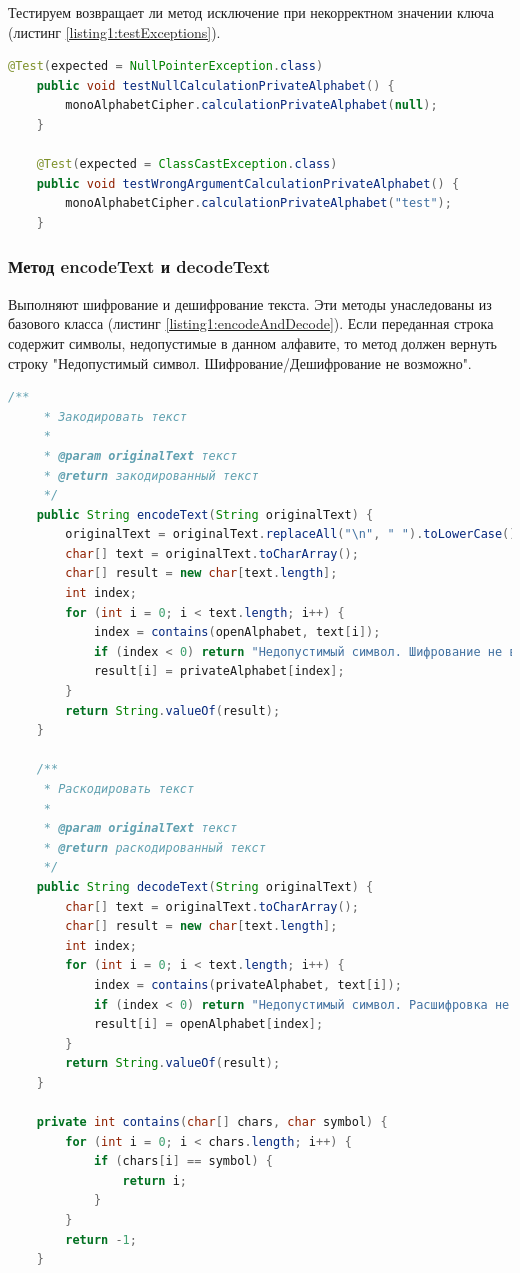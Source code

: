 \documentclass[a4paper,12pt]{article}
\begin{document}
Тестируем возвращает ли метод исключение при некорректном значении ключа (листинг \ref{listing1:testExceptions}).
\begin{lstlisting}[language=java, caption=методы проверки исключений, label = listing1:testExceptions]
	@Test(expected = NullPointerException.class)
    public void testNullCalculationPrivateAlphabet() {
        monoAlphabetCipher.calculationPrivateAlphabet(null);
    }

    @Test(expected = ClassCastException.class)
    public void testWrongArgumentCalculationPrivateAlphabet() {
        monoAlphabetCipher.calculationPrivateAlphabet("test");
    }
\end{lstlisting}
\subsubsection{Метод encodeText и decodeText}
Выполняют шифрование и дешифрование текста. Эти методы унаследованы из базового класса (листинг \ref{listing1:encodeAndDecode}). Если переданная строка содержит символы, недопустимые в данном алфавите, то метод должен вернуть строку "Недопустимый символ. Шифрование/Дешифрование не возможно".
\begin{lstlisting}[language=java, caption=методы encode и decode, label = listing1:encodeAndDecode]
     /**
     * Закодировать текст
     *
     * @param originalText текст
     * @return закодированный текст
     */
    public String encodeText(String originalText) {
        originalText = originalText.replaceAll("\n", " ").toLowerCase();
        char[] text = originalText.toCharArray();
        char[] result = new char[text.length];
        int index;
        for (int i = 0; i < text.length; i++) {
            index = contains(openAlphabet, text[i]);
            if (index < 0) return "Недопустимый символ. Шифрование не возможно";
            result[i] = privateAlphabet[index];
        }
        return String.valueOf(result);
    }

    /**
     * Раскодировать текст
     *
     * @param originalText текст
     * @return раскодированный текст
     */
    public String decodeText(String originalText) {
        char[] text = originalText.toCharArray();
        char[] result = new char[text.length];
        int index;
        for (int i = 0; i < text.length; i++) {
            index = contains(privateAlphabet, text[i]);
            if (index < 0) return "Недопустимый символ. Расшифровка не возможно";
            result[i] = openAlphabet[index];
        }
        return String.valueOf(result);
    }

    private int contains(char[] chars, char symbol) {
        for (int i = 0; i < chars.length; i++) {
            if (chars[i] == symbol) {
                return i;
            }
        }
        return -1;
    }
\end{lstlisting}
\end{document}
